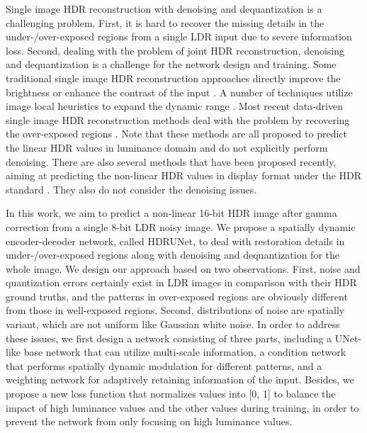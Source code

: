 \documentclass[final]{cvpr}
\begin{document}
Single image HDR reconstruction with denoising and dequantization is a challenging problem. First, it is hard to recover the missing details in the under-/over-exposed regions from a single LDR input due to severe information loss. Second, dealing with the problem of joint HDR reconstruction, denoising and dequantization is a challenge for the network design and training. Some traditional single image HDR reconstruction approaches directly improve the brightness or enhance the contrast of the input \cite{masia2009evaluation, masia2017, akyuz2007hdr}. A number of techniques utilize image local heuristics to expand the dynamic range \cite{banterle2006inverse, kovaleski2014high}. Most recent data-driven single image HDR reconstruction methods deal with the problem by recovering the over-exposed regions \cite{eilertsen2017hdr}. Note that these methods are all proposed to predict the linear HDR values in luminance domain and do not explicitly perform denoising. There are also several methods that have been proposed recently, aiming at predicting the non-linear HDR values in display format under the HDR standard \cite{kim2019deep, kim2020jsi}. They also do not consider the denoising issues.  

In this work, we aim to predict a non-linear 16-bit HDR image after gamma correction from a single 8-bit LDR noisy image. We propose a spatially dynamic encoder-decoder network, called HDRUNet, to deal with restoration details in under-/over-exposed regions along with denoising and dequantization for the whole image. We design our approach based on two observations. First, noise and quantization errors certainly exist in LDR images in comparison with their HDR ground truths, and the patterns in over-exposed regions are obviously different from those in well-exposed regions. Second, distributions of noise are spatially variant, which are not uniform like Gaussian white noise. In order to address these issues, we first design a network consisting of three parts, including a UNet-like base network that can utilize multi-scale information, a condition network that performs spatially dynamic modulation for different patterns, and a weighting network for adaptively retaining information of the input. Besides, we propose a new  loss function that normalizes values into [0, 1] to balance the impact of high luminance values and the other values during training, in order to prevent the network from only focusing on high luminance values.
\end{document}
